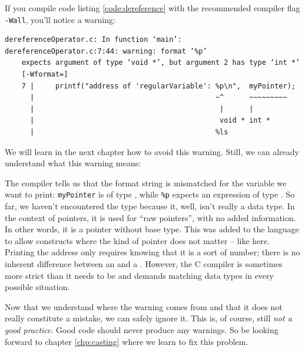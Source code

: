 {{{{\begin{plusbox}
If you compile code listing \ref{code:dereference} with the recommended compiler flag \texttt{-Wall}, you'll notice a warning:
\vspace{3pt}

\begin{cmdbox}
\begin{verbatim}
dereferenceOperator.c: In function ‘main’:
dereferenceOperator.c:7:44: warning: format ‘%p’ 
    expects argument of type ‘void *’, but argument 2 has type ‘int *’ 
    [-Wformat=]
    7 |     printf("address of 'regularVariable': %p\n",  myPointer);
      |                                           ~^      ~~~~~~~~~
      |                                            |      |
      |                                            void * int *
      |                                           %ls
\end{verbatim}
\end{cmdbox}

We will learn in the next chapter how to avoid this warning. Still, we can already understand what this warning means:
\end{plusbox}
\begin{plusbox}[]
The compiler tells us that the format string is mismatched for the variable we want to print: \texttt{myPointer} is of type , while \texttt{\%p} expects an expression of type . So far, we haven't encountered the type  because it, well, isn't really a data type. In the context of pointers, it is used for \enquote{raw pointers}, with no added information. In other words, it is a pointer without base type. This was added to the language to allow constructs where the kind of pointer does not matter -- like here. Printing the address only requires knowing that it is a sort of number; there is no inherent difference between an  and a . However, the C compiler is sometimes more strict than it needs to be and demands matching data types in every possible situation.

Now that we understand where the warning comes from and that it does not really constitute a mistake, we can safely ignore it. This is, of course, still \emph{not a good practice}. Good code should never produce any warnings. So be looking forward to chapter \ref{chp:casting} where we learn to fix this problem.
\end{plusbox}


}}}}
